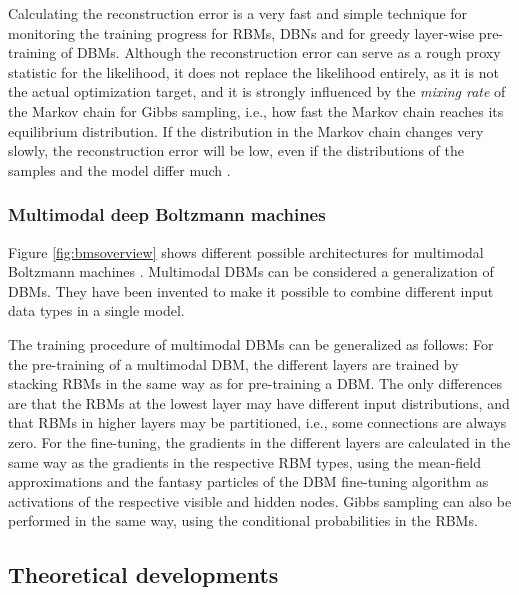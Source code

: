 \documentclass[12pt]{article}
\begin{document}
Calculating the reconstruction error  is a very fast and simple technique for monitoring the training progress for RBMs, DBNs and for greedy layer-wise pre-training of DBMs.
Although the reconstruction error can serve as a rough proxy statistic for the likelihood, it does not replace the likelihood entirely, as it is not the actual optimization target, and it is strongly influenced by the {\em mixing rate} of the Markov chain for Gibbs sampling, i.e., how fast the Markov chain reaches its equilibrium distribution. If the distribution in the Markov chain changes very slowly, the reconstruction error will be low, even if the distributions of the samples and the model differ much \citep{hinton_practical_2012}.

\subsubsection{Multimodal deep Boltzmann machines}

Figure \ref{fig:bmsoverview} shows different possible architectures for multimodal Boltzmann machines \citep{srivastava2012multimodal}.
Multimodal DBMs can be considered a generalization of DBMs.
They have been invented to make it possible to combine different input data types in a single model.

The training procedure of multimodal DBMs can be generalized as follows:
For the pre-training of a multimodal DBM, the different layers are trained by stacking RBMs in the same way as for pre-training a DBM.
The only differences are that the RBMs at the lowest layer may have different input distributions, and that RBMs in higher layers may be partitioned, i.e., some connections are always zero.
For the fine-tuning, the gradients in the different layers are calculated in the same way as the gradients in the respective RBM types, using the mean-field approximations and the fantasy particles of the DBM fine-tuning algorithm as activations of the respective visible and hidden nodes.
Gibbs sampling can also be performed in the same way, using the conditional probabilities in the RBMs.


\subsection{Theoretical developments}\label{bmaddtheory}
\end{document}
